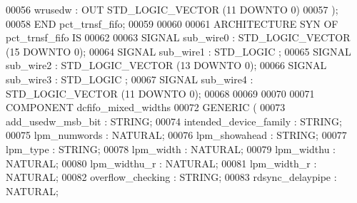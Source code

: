 \begin{DoxyCode}
{00056         \textcolor{vhdlchar}{wrusedw}     \textcolor{vhdlchar}{:} \textcolor{keywordflow}{OUT} \textcolor{comment}{STD\_LOGIC\_VECTOR} \textcolor{vhdlchar}{(}\textcolor{vhdllogic}{}\textcolor{vhdllogic}{11} \textcolor{keywordflow}{DOWNTO} \textcolor{vhdllogic}{}\textcolor{vhdllogic}{0}\textcolor{vhdlchar}{)}
00057     \textcolor{vhdlchar}{)};
00058 \textcolor{keywordflow}{END} \textcolor{vhdlchar}{pct\_trnsf\_fifo};
00059 
00060 
00061 \textcolor{keywordflow}{ARCHITECTURE} SYN \textcolor{keywordflow}{OF} pct_trnsf_fifo IS
00062 
00063     \textcolor{keywordflow}{SIGNAL} \textcolor{vhdlchar}{sub_wire0}    \textcolor{vhdlchar}{:} \textcolor{comment}{STD\_LOGIC\_VECTOR} \textcolor{vhdlchar}{(}\textcolor{vhdllogic}{}\textcolor{vhdllogic}{15} \textcolor{keywordflow}{DOWNTO} \textcolor{vhdllogic}{}\textcolor{vhdllogic}{0}\textcolor{vhdlchar}{)};
00064     \textcolor{keywordflow}{SIGNAL} \textcolor{vhdlchar}{sub_wire1}    \textcolor{vhdlchar}{:} \textcolor{comment}{STD\_LOGIC} ;
00065     \textcolor{keywordflow}{SIGNAL} \textcolor{vhdlchar}{sub_wire2}    \textcolor{vhdlchar}{:} \textcolor{comment}{STD\_LOGIC\_VECTOR} \textcolor{vhdlchar}{(}\textcolor{vhdllogic}{}\textcolor{vhdllogic}{13} \textcolor{keywordflow}{DOWNTO} \textcolor{vhdllogic}{}\textcolor{vhdllogic}{0}\textcolor{vhdlchar}{)};
00066     \textcolor{keywordflow}{SIGNAL} \textcolor{vhdlchar}{sub_wire3}    \textcolor{vhdlchar}{:} \textcolor{comment}{STD\_LOGIC} ;
00067     \textcolor{keywordflow}{SIGNAL} \textcolor{vhdlchar}{sub_wire4}    \textcolor{vhdlchar}{:} \textcolor{comment}{STD\_LOGIC\_VECTOR} \textcolor{vhdlchar}{(}\textcolor{vhdllogic}{}\textcolor{vhdllogic}{11} \textcolor{keywordflow}{DOWNTO} \textcolor{vhdllogic}{}\textcolor{vhdllogic}{0}\textcolor{vhdlchar}{)};
00068 
00069 
00070 
00071     \textcolor{keywordflow}{COMPONENT} dcfifo\_mixed\_widths
00072     \textcolor{keywordflow}{GENERIC} (
00073         add\_usedw\_msb\_bit       : \textcolor{comment}{STRING};
00074         intended\_device\_family      : \textcolor{comment}{STRING};
00075         lpm\_numwords        : \textcolor{comment}{NATURAL};
00076         lpm\_showahead       : \textcolor{comment}{STRING};
00077         lpm\_type        : \textcolor{comment}{STRING};
00078         lpm\_width       : \textcolor{comment}{NATURAL};
00079         lpm\_widthu      : \textcolor{comment}{NATURAL};
00080         lpm\_widthu\_r        : \textcolor{comment}{NATURAL};
00081         lpm\_width\_r     : \textcolor{comment}{NATURAL};
00082         overflow\_checking       : \textcolor{comment}{STRING};
00083         rdsync\_delaypipe        : \textcolor{comment}{NATURAL};
}
\end{DoxyCode}
